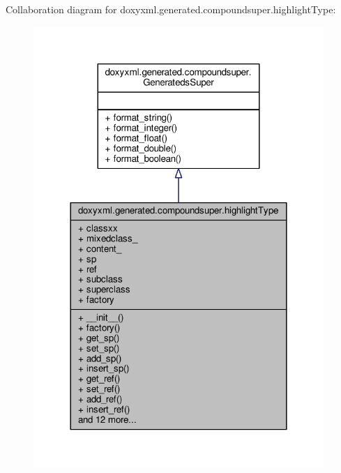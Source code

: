 Collaboration diagram for doxyxml.\+generated.\+compoundsuper.\+highlight\+Type\+:
\nopagebreak
\begin{figure}[H]
\begin{center}
\leavevmode
\includegraphics[width=312pt]{d6/d39/classdoxyxml_1_1generated_1_1compoundsuper_1_1highlightType__coll__graph}
\end{center}
\end{figure}
